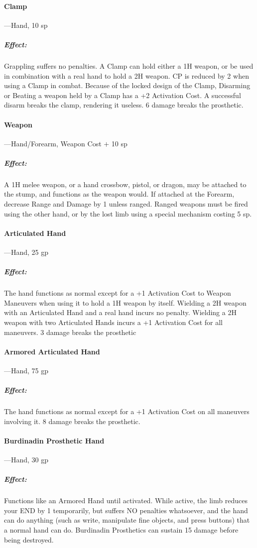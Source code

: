 \documentclass[oneside,11pt,english]{book}
\begin{document}
\paragraph{Clamp}---\quad Hand, 10 sp 
	\vspace{-15pt} \subparagraph{Effect:} Grappling suffers no penalties. A Clamp can hold either a 1H weapon, or be used in combination with a real hand to hold a 2H weapon. CP is reduced by 2 when using a Clamp in combat. Because of the locked design of the Clamp, Disarming or Beating a weapon held by a Clamp has a +2 Activation Cost. A successful disarm breaks the clamp, rendering it useless. 6 damage breaks the prosthetic. 
\paragraph{Weapon}---\quad Hand/Forearm, Weapon Cost $+$ 10 sp
	\vspace{-15pt} \subparagraph{Effect:} A 1H melee weapon, or a hand crossbow, pistol, or dragon, may be attached to the stump, and functions as the weapon would. If attached at the Forearm, decrease Range and Damage by 1 unless ranged. Ranged weapons must be fired using the other hand, or by the lost limb using a special mechanism costing 5 sp.
\paragraph{Articulated Hand}---\quad Hand, 25 gp
	\vspace{-15pt} \subparagraph{Effect:} The hand functions as normal except for a +1 Activation Cost to Weapon Maneuvers when using it to hold a 1H weapon by itself. Wielding a 2H weapon with an Articulated Hand and a real hand incurs no penalty. Wielding a 2H weapon with two Articulated Hands incurs a +1 Activation Cost for all maneuvers. 3 damage breaks the prosthetic
\paragraph{Armored Articulated Hand}---\quad Hand, 75 gp
	\vspace{-15pt} \subparagraph{Effect:} The hand functions as normal except for a +1 Activation Cost on all maneuvers involving it. 8 damage breaks the prosthetic.
\paragraph{Burdinadin Prosthetic Hand}---\quad Hand, 30 gp
	\vspace{-15pt} \subparagraph{Effect:} Functions like an Armored Hand until activated. While active, the limb reduces your END by 1 temporarily, but suffers NO penalties whatsoever, and the hand can do anything (such as write, manipulate fine objects, and press buttons) that a normal hand can do. Burdinadin Prosthetics can sustain 15 damage before being destroyed.
\end{document}
